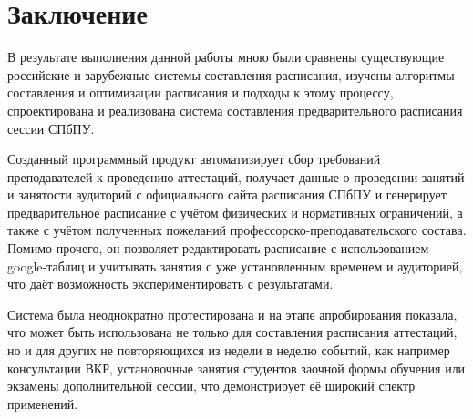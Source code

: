 \chapter*{Заключение} \label{ch-conclusion}

В результате выполнения данной работы мною были сравнены существующие российские и зарубежные системы составления расписания, изучены алгоритмы составления и оптимизации расписания и подходы к этому процессу, спроектирована и реализована система составления предварительного расписания сессии СПбПУ. 

Созданный программный продукт автоматизирует сбор требований преподавателей к проведению аттестаций, получает данные о проведении занятий и занятости аудиторий с официального сайта расписания СПбПУ и генерирует предварительное расписание с учётом физических и нормативных ограничений, а также с учётом полученных пожеланий профессорско-преподавательского состава. Помимо прочего, он позволяет редактировать расписание с использованием google-таблиц и учитывать занятия с уже установленным временем и аудиторией, что даёт возможность экспериментировать с результатами.

Система была неоднократно протестирована и на этапе апробирования показала, что может быть использована не только для составления расписания аттестаций, но и для других не повторяющихся из недели в неделю событий, как например консультации ВКР, установочные занятия студентов заочной формы обучения или экзамены дополнительной сессии, что демонстрирует её широкий спектр применений.